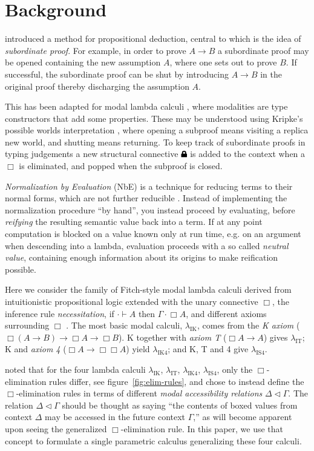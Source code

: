 \documentclass{article}
\newcommand{\lock}{
  \text{\tikz[baseline]{
      \fill[rounded corners=.1ex] (-.75ex,0) rectangle (.75ex,1ex);
      \draw[line width=.3ex] (-.4ex,.5ex) -- ++(0,.75ex) arc (180:0:.4ex) -- ++(0,-.75ex);
}}}
\begin{document}
\section{Background}

\textcite{fitch52} introduced a method for propositional deduction,
central to which is the idea of \emph{subordinate proof}.
For example, in order to prove $A \rightarrow B$ a subordinate proof may be opened
containing the new assumption $A$, where one sets out to prove $B$.
If successful, the subordinate proof can be shut
by introducing $A \rightarrow B$ in the original proof
thereby discharging the assumption $A$.

This has been adapted for modal lambda calculi \cite{borghuis94},
where modalities are type constructors that add some properties.
These may be understood using Kripke's possible worlds interpretation \cite{kripke63, huth04},
where opening a subproof means visiting a replica new world,
and shutting means returning.
To keep track of subordinate proofs in typing judgements
a new structural connective $\lock$ is added to the context when a $\Box$ is eliminated,
and popped when the subproof is closed.

\emph{Normalization by Evaluation} (NbE) is a technique for reducing terms to their normal forms,
which are not further reducible \cite{berger91}.
Instead of implementing the normalization procedure ``by hand'',
you instead proceed by evaluating,
before \emph{reifying} the resulting semantic value back into a term.
If at any point computation is blocked on a value known only at run time,
e.g. on an argument when descending into a lambda,
evaluation proceeds with a so called \emph{neutral value},
containing enough information about its origins to make reification possible.

Here we consider the family of Fitch-style modal lambda calculi
derived from intuitionistic propositional logic
extended with the unary connective $\Box$,
the inference rule \emph{necessitation}, if $\cdot \vdash A$ then $\Gamma \cdot \Box A$,
and different axioms surrounding $\Box$ \cite{clouston18}.
The most basic modal calculi, $\lambda_\text{IK}$,
comes from the \emph{K axiom}
($\Box(A \rightarrow B) \rightarrow \Box A \rightarrow \Box B$).
K together with \emph{axiom T} ($\Box A \rightarrow A$) gives $\lambda_\text{IT}$;
K and \emph{axiom 4} ($\Box A \rightarrow \Box\Box A$) yield $\lambda_\text{IK4}$;
and K, T and 4 give $\lambda_\text{IS4}$.

\textcite{valliappan22} noted that for the four lambda calculi
$\lambda_\text{IK}$, $\lambda_\text{IT}$, $\lambda_\text{IK4}$, $\lambda_\text{IS4}$,
only the $\Box$-elimination rules differ,
see figure~\ref{fig:elim-rules},
and chose to instead define the $\Box$-elimination rules
in terms of different \emph{modal accessibility relations} $\Delta\lhd\Gamma$.
The relation $\Delta\lhd\Gamma$ should be thought as saying
``the contents of boxed values from context $\Delta$ may be accessed in the future context $\Gamma$,''
as will become apparent upon seeing the generalized $\Box$-elimination rule.
In this paper,
we use that concept to formulate a single parametric calculus generalizing these four calculi.
\end{document}
